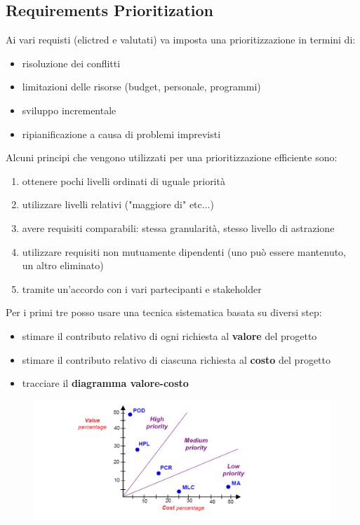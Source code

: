 \subsection{Requirements Prioritization}
Ai vari requisti (elictred e valutati) va imposta una prioritizzazione in termini di:
\begin{itemize}
  \item risoluzione dei conflitti 
  \item limitazioni delle risorse (budget, personale, programmi) 
  \item sviluppo incrementale 
  \item ripianificazione a causa di problemi imprevisti
\end{itemize}
Alcuni principi che vengono utilizzati per una prioritizzazione efficiente sono:
\begin{enumerate}
  \item ottenere pochi livelli ordinati di uguale priorità
  \item utilizzare livelli relativi ("maggiore di" etc$\ldots$) 
  \item avere requisiti comparabili: stessa granularità, stesso livello di astrazione 
  \item utilizzare requisiti non mutuamente dipendenti (uno può essere mantenuto, un altro eliminato) 
  \item tramite un'accordo con i vari partecipanti e stakeholder
\end{enumerate}
Per i primi tre posso usare una tecnica sistematica basata su diversi step:
\begin{itemize}
  \item stimare il contributo relativo di ogni richiesta al \textbf{valore} del progetto 
  \item stimare il contributo relativo di ciascuna richiesta al \textbf{costo} del progetto 
  \item tracciare il \textbf{diagramma valore-costo}
\end{itemize}
\begin{figure}[H]
    \centering
    \includegraphics[scale = 0.5]{Imm/plot.PNG}
\end{figure}

